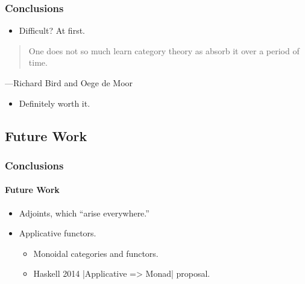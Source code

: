\documentclass{beamer}
\begin{document}

\begin{frame}
  \frametitle{Conclusions}

  \begin{itemize}
  \item
    Difficult? At first.
  \end{itemize}
  \vfill
  \begin{quote}
    One does not so much learn category theory as absorb it over a
    period of time.
  \end{quote}
  \hfill ---Richard Bird and Oege de Moor \vfill
  \begin{itemize}
  \item
    Definitely worth it.
  \end{itemize}

\end{frame}


\subsection{Future Work}


\begin{frame}[fragile,label={future-work}]
  \frametitle{Conclusions}
  \framesubtitle{Future Work}

  \begin{itemize}
  \item
    Adjoints, which ``arise everywhere.''
  \end{itemize}
  \begin{itemize}
  \item
    Applicative functors.
    \begin{itemize}
    \item
      Monoidal categories and functors.
    \item
      Haskell 2014 |Applicative => Monad| proposal.
    \end{itemize}
  \end{itemize}

\end{frame}

\end{document}
